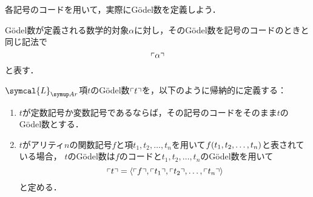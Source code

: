各記号のコードを用いて，実際にGödel数を定義しよう．

%
%
\begin{Def}[Gödel数の表記] \label{Def:GodelNumbernotation}
	Gödel数が定義される数学的対象\(\alpha\)に対し，そのGödel数を記号のコードのときと同じ記法で%
	\begin{equation}
		\mathopen{}\left\ulcorner \alpha \right\urcorner\mathclose{}
		\label{eq:GodelNumber}
	\end{equation}
	と表す．
\end{Def}


\begin{Def}[項のGödel数] \label{Def:termGodelNumber}
	\(\symcal{L}_{\Ar}\)項\(t\)のGödel数\(\mathopen{}\left\ulcorner t \right\urcorner\mathclose{}\)を，以下のように帰納的に定義する：
	\begin{enumerate}
		\item \(t\)が定数記号か変数記号であるならば，その記号のコードをそのまま\(t\)のGödel数とする．
		\item \(t\)がアリティ\(n\)の関数記号\(f\)と項\(t_1, t_2, \dots, t_n\)を用いて\(\apply{f}{t_1, t_2, \dots, t_n}\)と表されている場合，
		      \(t\)のGödel数は\(f\)のコードと\(t_1, t_2, \dots, t_n\)のGödel数を用いて
		      \begin{equation}
			      \mathopen{}\left\ulcorner t \right\urcorner\mathclose{} = \langle \mathopen{}\left\ulcorner f \right\urcorner\mathclose{}, \mathopen{}\left\ulcorner t_1 \right\urcorner\mathclose{}, \mathopen{}\left\ulcorner t_2 \right\urcorner\mathclose{}, \dots, \mathopen{}\left\ulcorner t_n \right\urcorner\mathclose{} \rangle
			      \label{eq:termGodelNumber}
		      \end{equation}
		      と定める．
	\end{enumerate}
\end{Def}

